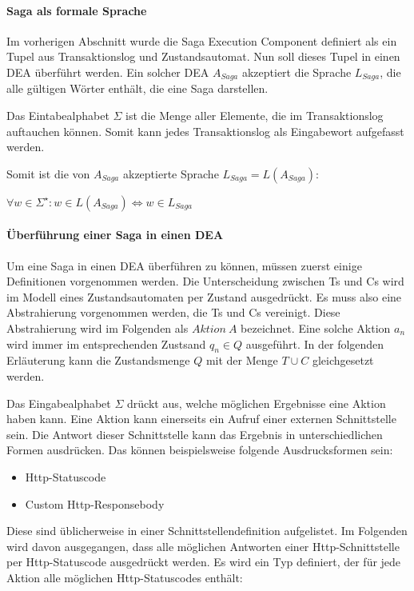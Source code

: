 \paragraph{Saga als formale Sprache}
Im vorherigen Abschnitt wurde die Saga Execution Component definiert als ein Tupel aus Transaktionslog und Zustandsautomat. Nun soll dieses Tupel in einen DEA überführt werden. Ein solcher DEA $A_{Saga}$ akzeptiert die Sprache $L_{Saga}$, die alle gültigen Wörter enthält, die eine Saga darstellen.

Das Eintabealphabet $\Sigma$ ist die Menge aller Elemente, die im Transaktionslog auftauchen können. Somit kann jedes Transaktionslog als Eingabewort aufgefasst werden. 

Somit ist die von $A_{Saga}$ akzeptierte Sprache $L_{Saga} = L(A_{Saga})$: \\

\begin{center}
$\forall w \in \Sigma^{\star}: w \in L(A_{Saga}) \iff w \in L_{Saga}$
\end{center}

\paragraph{Überführung einer Saga in einen DEA}
Um eine Saga in einen DEA überführen zu können, müssen zuerst einige Definitionen vorgenommen werden. Die Unterscheidung zwischen Ts und Cs wird im Modell eines Zustandsautomaten per Zustand ausgedrückt. Es muss also eine Abstrahierung vorgenommen werden, die Ts und Cs vereinigt. Diese Abstrahierung wird im Folgenden als $Aktion\ A$ bezeichnet. Eine solche Aktion $a_n$ wird immer im entsprechenden Zustsand $q_n \in Q$ ausgeführt. In der folgenden Erläuterung kann die Zustandsmenge $Q$ mit der Menge $T \cup C$ gleichgesetzt werden.

Das Eingabealphabet $\Sigma$ drückt aus, welche möglichen Ergebnisse eine Aktion haben kann. Eine Aktion kann einerseits ein Aufruf einer externen Schnittstelle sein. Die Antwort dieser Schnittstelle kann das Ergebnis in unterschiedlichen Formen ausdrücken. Das können beispielsweise folgende Ausdrucksformen sein:
\begin{itemize}
	\item Http-Statuscode
	\item Custom Http-Responsebody
\end{itemize}
Diese sind üblicherweise in einer Schnittstellendefinition aufgelistet. Im Folgenden wird davon ausgegangen, dass alle möglichen Antworten einer Http-Schnittstelle per Http-Statuscode ausgedrückt werden. Es wird ein Typ definiert, der für jede Aktion alle möglichen Http-Statuscodes enthält: 

